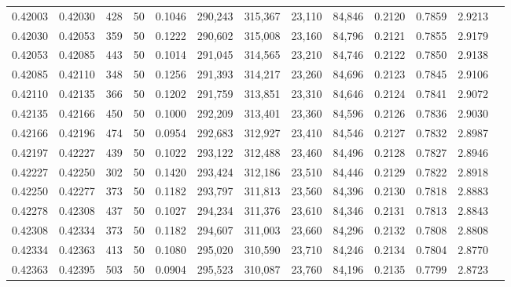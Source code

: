 \begin{tabular}{rrrrrrrrrrrrr}
0.42003 & 0.42030 &   428 &  50 &                                     0.1046 & 290,243 & 315,367 &  23,110 &  84,846 & 0.2120 & 0.7859 & 2.9213 \\
0.42030 & 0.42053 &   359 &  50 &                                     0.1222 & 290,602 & 315,008 &  23,160 &  84,796 & 0.2121 & 0.7855 & 2.9179 \\
0.42053 & 0.42085 &   443 &  50 &                                     0.1014 & 291,045 & 314,565 &  23,210 &  84,746 & 0.2122 & 0.7850 & 2.9138 \\
0.42085 & 0.42110 &   348 &  50 &                                     0.1256 & 291,393 & 314,217 &  23,260 &  84,696 & 0.2123 & 0.7845 & 2.9106 \\
0.42110 & 0.42135 &   366 &  50 &                                     0.1202 & 291,759 & 313,851 &  23,310 &  84,646 & 0.2124 & 0.7841 & 2.9072 \\
0.42135 & 0.42166 &   450 &  50 &                                     0.1000 & 292,209 & 313,401 &  23,360 &  84,596 & 0.2126 & 0.7836 & 2.9030 \\
0.42166 & 0.42196 &   474 &  50 &                                     0.0954 & 292,683 & 312,927 &  23,410 &  84,546 & 0.2127 & 0.7832 & 2.8987 \\
0.42197 & 0.42227 &   439 &  50 &                                     0.1022 & 293,122 & 312,488 &  23,460 &  84,496 & 0.2128 & 0.7827 & 2.8946 \\
0.42227 & 0.42250 &   302 &  50 &                                     0.1420 & 293,424 & 312,186 &  23,510 &  84,446 & 0.2129 & 0.7822 & 2.8918 \\
0.42250 & 0.42277 &   373 &  50 &                                     0.1182 & 293,797 & 311,813 &  23,560 &  84,396 & 0.2130 & 0.7818 & 2.8883 \\
0.42278 & 0.42308 &   437 &  50 &                                     0.1027 & 294,234 & 311,376 &  23,610 &  84,346 & 0.2131 & 0.7813 & 2.8843 \\
0.42308 & 0.42334 &   373 &  50 &                                     0.1182 & 294,607 & 311,003 &  23,660 &  84,296 & 0.2132 & 0.7808 & 2.8808 \\
0.42334 & 0.42363 &   413 &  50 &                                     0.1080 & 295,020 & 310,590 &  23,710 &  84,246 & 0.2134 & 0.7804 & 2.8770 \\
0.42363 & 0.42395 &   503 &  50 &                                     0.0904 & 295,523 & 310,087 &  23,760 &  84,196 & 0.2135 & 0.7799 & 2.8723 \\

\end{tabular}

